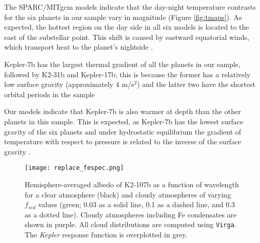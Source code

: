 \documentclass[twocolumn]{aastex63}
\begin{document}
The SPARC/MITgcm models indicate that the day-night temperature contrasts for the six planets in our sample vary in magnitude (Figure \ref{fig:tmaps}). As expected, the hottest region on the day side in all six models is located to the east of the substellar point.  This shift is caused by eastward equatorial winds, which transport heat to the planet's nightside \citep[e.g.,][and references therein]{showman2020}.

Kepler-7b has the largest thermal gradient of all the planets in our sample, followed by K2-31b and Kepler-17b; this is because the former has a relatively low surface gravity (approximately 4 m/s$^2$) and the latter two have the shortest orbital periods in the sample

\color{black}{Kepler-7b has the largest thermal gradient of all the planets in our sample, followed by K2-31b and Kepler-17b; this is because the former has a relatively low surface gravity (approximately 4 m/s$^2$) and the latter two have the shortest orbital periods in the sample.} \color{black}Our models indicate that Kepler-7b is also warmer at depth than the other planets in this sample.  This is expected, as Kepler-7b has the lowest surface gravity of the six planets and under hydrostatic equilibrium the gradient of temperature with respect to pressure is related to the inverse of the surface gravity \citep[e.g.,][]{gao2018}.  



\begin{figure}
    \texttt{[image: replace\_fespec.png]}
    \caption{Hemisphere-averaged albedo of K2-107b as a function of wavelength for a clear atmosphere (black) and cloudy atmospheres of varying $f_{sed}$ values (green; 0.03 as a solid line, 0.1 as a dashed line, and 0.3 as a dotted line). Cloudy atmospheres including Fe condensates  are shown in purple. All cloud distributions are computed using \texttt{Virga}. The \emph{Kepler} response function is overplotted in grey.}
    \label{fig:a-K107}
\end{figure}
\end{document}
